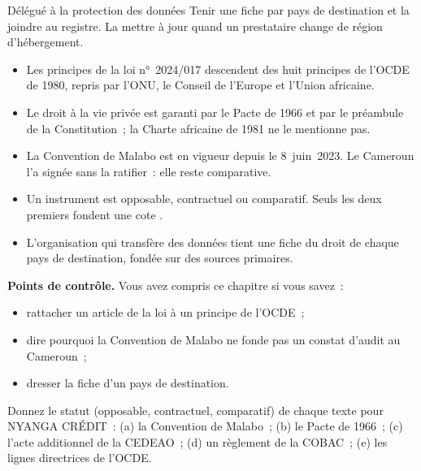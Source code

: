 \begin{boxmetier}{Délégué à la protection des données}
Tenir une fiche par pays de destination et la joindre au registre. La
mettre à jour quand un prestataire change de région d'hébergement.
\end{boxmetier}

\begin{boxresume}
\begin{itemize}
    \item Les principes de la loi n°~2024/017 descendent des huit principes
          de l'OCDE de 1980, repris par l'ONU, le Conseil de l'Europe et
          l'Union africaine.
    \item Le droit à la vie privée est garanti par le Pacte de 1966 et par
          le préambule de la Constitution~; la Charte africaine de 1981 ne
          le mentionne pas.
    \item La Convention de Malabo est en vigueur depuis le 8~juin~2023. Le
          Cameroun l'a signée sans la ratifier~: elle reste comparative.
    \item Un instrument est opposable, contractuel ou comparatif. Seuls les
          deux premiers fondent une cote \NON{}.
    \item L'organisation qui transfère des données tient une fiche du droit
          de chaque pays de destination, fondée sur des sources primaires.
\end{itemize}
\end{boxresume}

\begin{boxinfo}
\textbf{Points de contrôle.} Vous avez compris ce chapitre si vous savez~:
\begin{itemize}
    \item rattacher un article de la loi à un principe de l'OCDE~;
    \item dire pourquoi la Convention de Malabo ne fonde pas un constat
          d'audit au Cameroun~;
    \item dresser la fiche d'un pays de destination.
\end{itemize}
\end{boxinfo}

\begin{boxexo}[title={\ding{45}\quad Exercice~3.1. Quel statut \niveaubase}]
Donnez le statut (opposable, contractuel, comparatif) de chaque texte pour
NYANGA CRÉDIT~: (a) la Convention de Malabo~; (b) le Pacte de 1966~;
(c) l'acte additionnel de la CEDEAO~; (d) un règlement de la COBAC~;
(e) les lignes directrices de l'OCDE.
\end{boxexo}

